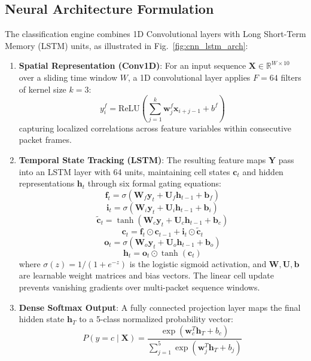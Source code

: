 \documentclass[conference]{IEEEtran}
\begin{document}
\subsection{Neural Architecture Formulation}
The classification engine combines 1D Convolutional layers with Long Short-Term Memory (LSTM) units, as illustrated in Fig.~\ref{fig:cnn_lstm_arch}:
\begin{enumerate}
    \item \textbf{Spatial Representation (Conv1D)}: For an input sequence $\mathbf{X} \in \mathbb{R}^{W \times 10}$ over a sliding time window $W$, a 1D convolutional layer applies $F = 64$ filters of kernel size $k = 3$:
    \begin{equation}
    y_i^f = \text{ReLU}\left(\sum_{j=1}^k \mathbf{w}_j^f \mathbf{x}_{i+j-1} + b^f\right)
    \end{equation}
    capturing localized correlations across feature variables within consecutive packet frames.
    \item \textbf{Temporal State Tracking (LSTM)}: The resulting feature maps $\mathbf{Y}$ pass into an LSTM layer with 64 units, maintaining cell states $\mathbf{c}_t$ and hidden representations $\mathbf{h}_t$ through six formal gating equations:
    \begin{equation}
    \mathbf{f}_t = \sigma(\mathbf{W}_f \mathbf{y}_t + \mathbf{U}_f \mathbf{h}_{t-1} + \mathbf{b}_f)
    \end{equation}
    \begin{equation}
    \mathbf{i}_t = \sigma(\mathbf{W}_i \mathbf{y}_t + \mathbf{U}_i \mathbf{h}_{t-1} + \mathbf{b}_i)
    \end{equation}
    \begin{equation}
    \tilde{\mathbf{c}}_t = \tanh(\mathbf{W}_c \mathbf{y}_t + \mathbf{U}_c \mathbf{h}_{t-1} + \mathbf{b}_c)
    \end{equation}
    \begin{equation}
    \mathbf{c}_t = \mathbf{f}_t \odot \mathbf{c}_{t-1} + \mathbf{i}_t \odot \tilde{\mathbf{c}}_t
    \end{equation}
    \begin{equation}
    \mathbf{o}_t = \sigma(\mathbf{W}_o \mathbf{y}_t + \mathbf{U}_o \mathbf{h}_{t-1} + \mathbf{b}_o)
    \end{equation}
    \begin{equation}
    \mathbf{h}_t = \mathbf{o}_t \odot \tanh(\mathbf{c}_t)
    \end{equation}
    where $\sigma(z) = 1/(1+e^{-z})$ is the logistic sigmoid activation, and $\mathbf{W}, \mathbf{U}, \mathbf{b}$ are learnable weight matrices and bias vectors. The linear cell update prevents vanishing gradients over multi-packet sequence windows.
    \item \textbf{Dense Softmax Output}: A fully connected projection layer maps the final hidden state $\mathbf{h}_T$ to a 5-class normalized probability vector:
    \begin{equation}
    P(y = c \mid \mathbf{X}) = \frac{\exp(\mathbf{w}_c^T \mathbf{h}_T + b_c)}{\sum_{j=1}^5 \exp(\mathbf{w}_j^T \mathbf{h}_T + b_j)}
    \end{equation}
\end{enumerate}
\end{document}
